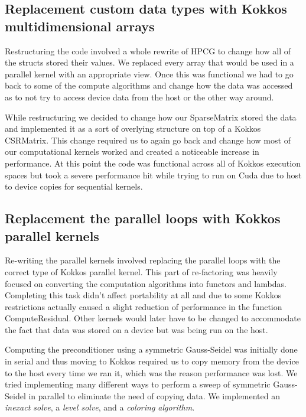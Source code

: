 \documentclass{ccr15}
\begin{document}



\subsection{Replacement custom data types with Kokkos multidimensional arrays}

Restructuring the code involved a whole rewrite of HPCG to change how all of the structs stored
their values. We replaced every array that would be used in a parallel kernel with an appropriate
view. Once this was functional we had to go back to some of the compute algorithms and change
how the data was accessed as to not try to access device data from the host or the
other way around.

While restructuring we decided to change how our SparseMatrix stored the data and implemented it
as a sort of overlying structure on top of a Kokkos CSRMatrix. This change required us to again
go back and change how most of our computational kernels worked and created a noticeable increase
in performance. At this point the code was functional across all of Kokkos execution spaces but
took a severe performance hit while trying to run on Cuda due to host to device copies for sequential kernels.


\subsection{Replacement the parallel loops with Kokkos parallel kernels}

Re-writing the parallel kernels involved replacing the parallel loops with the correct type of
Kokkos parallel kernel. This part of re-factoring was heavily focused on converting the
computation algorithms into functors and lambdas. Completing this task didn't affect portability
at all and due to some Kokkos restrictions actually caused a slight reduction of performance in
the function ComputeResidual. Other kernels would later have to be changed to accommodate the fact
that data was stored on a device but was being run on the host.

Computing the preconditioner using a symmetric Gauss-Seidel was initially done in serial and thus
moving to Kokkos required us to copy memory from the device to the host every time we ran it,
which was the reason performance was lost. We tried implementing many different ways to perform
a sweep of symmetric Gauss-Seidel in parallel to eliminate the need of copying data. We
implemented an \emph{inexact solve}, a \emph{level solve}, and a \emph{coloring algorithm}.
\end{document}
